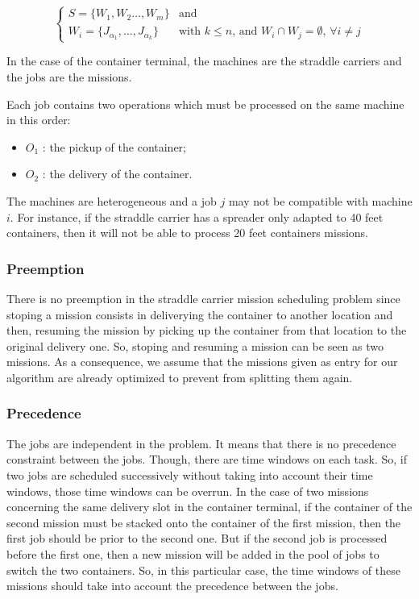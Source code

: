 \documentclass[a4paper,10pt]{article}
\begin{document}
\begin{equation*}
\begin{cases}
 S = \{ W_{1} , W_{2} \ldots , W_{m}\} & \text{and}\\
 W_{i} = \{ J_{\alpha_1} , \ldots , J_{\alpha_k} \} & \text{with $k \leq n$, and $W_{i} \cap W_{j} = \emptyset$,  $\forall i \neq j$} 
\end{cases}
\end{equation*}


In the case of the container terminal, the machines are the straddle carriers and the jobs are the missions.
 
Each job contains two operations which must be processed on the same machine in this order:
\begin{itemize}
 \item $O_1$ : the pickup of the container;
 \item $O_2$ : the delivery of the container.
\end{itemize}

The machines are heterogeneous and a job $j$ may not be compatible with machine $i$. For instance, if the straddle carrier has a spreader only adapted to 40 feet containers, then it will not be able to process 20 feet containers missions.

\subsubsection{Preemption}
There is no preemption in the straddle carrier mission scheduling problem since stoping a mission consists in deliverying the container to another location and then, resuming the mission by picking up the container from that location to the original delivery one. So, stoping and resuming a mission can be seen as two missions. As a consequence, we assume that the missions given as entry for our algorithm are already optimized to prevent from splitting them again.

\subsubsection{Precedence}
The jobs are independent in the problem. It means that there is no precedence constraint between the jobs. Though, there are time windows on each task. So, if two jobs are scheduled successively without taking into account their time windows, those time windows can be overrun. In the case of two missions concerning the same delivery slot in the container terminal, if the container of the second mission must be stacked onto the container of the first mission, then the first job should be prior to the second one. But if the second job is processed before the first one, then a new mission will be added in the pool of jobs to switch the two containers. So, in this particular case, the time windows of these missions should take into account the precedence between the jobs.
\end{document}
